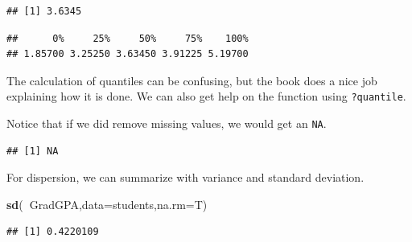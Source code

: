 \documentclass[]{book}
\newenvironment{Shaded}{\begin{snugshade}}{\end{snugshade}}
\newcommand{\KeywordTok}[1]{\textcolor[rgb]{0.13,0.29,0.53}{\textbf{#1}}}
\newcommand{\DataTypeTok}[1]{\textcolor[rgb]{0.13,0.29,0.53}{#1}}
\newcommand{\OtherTok}[1]{\textcolor[rgb]{0.56,0.35,0.01}{#1}}
\newcommand{\OperatorTok}[1]{\textcolor[rgb]{0.81,0.36,0.00}{\textbf{#1}}}
\newcommand{\NormalTok}[1]{#1}
\theoremstyle{definition}
\theoremstyle{definition}
\theoremstyle{definition}
\theoremstyle{remark}
\begin{document}
\begin{Shaded}
\end{Shaded}

\begin{verbatim}
## [1] 3.6345
\end{verbatim}

\begin{Shaded}
\end{Shaded}

\begin{verbatim}
##      0%     25%     50%     75%    100% 
## 1.85700 3.25250 3.63450 3.91225 5.19700
\end{verbatim}

The calculation of quantiles can be confusing, but the book does a nice
job explaining how it is done. We can also get help on the function
using \texttt{?quantile}.

Notice that if we did remove missing values, we would get an
\texttt{NA}.

\begin{Shaded}
\end{Shaded}

\begin{verbatim}
## [1] NA
\end{verbatim}

For dispersion, we can summarize with variance and standard deviation.

\begin{Shaded}
\begin{Highlighting}[]
\KeywordTok{sd}\NormalTok{(}\OperatorTok{~}\NormalTok{GradGPA,}\DataTypeTok{data=}\NormalTok{students,}\DataTypeTok{na.rm=}\NormalTok{T)}
\end{Highlighting}
\end{Shaded}

\begin{verbatim}
## [1] 0.4220109
\end{verbatim}
\end{document}
